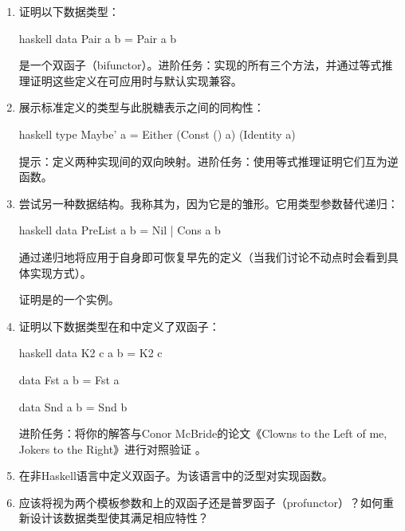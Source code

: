 \begin{enumerate}
  \tightlist
  \item
        证明以下数据类型：

        \begin{snip}{haskell}
data Pair a b = Pair a b
\end{snip}

        是一个双函子（bifunctor）。进阶任务：实现的所有三个方法，并通过等式推理证明这些定义在可应用时与默认实现兼容。
  \item
        展示标准定义的类型与此脱糖表示之间的同构性：

        \begin{snip}{haskell}
type Maybe' a = Either (Const () a) (Identity a)
\end{snip}

        提示：定义两种实现间的双向映射。进阶任务：使用等式推理证明它们互为逆函数。
  \item
        尝试另一种数据结构。我称其为，因为它是的雏形。它用类型参数替代递归：

        \begin{snip}{haskell}
data PreList a b = Nil | Cons a b
\end{snip}

        通过递归地将应用于自身即可恢复早先的定义（当我们讨论不动点时会看到具体实现方式）。

        证明是的一个实例。
  \item
        证明以下数据类型在和中定义了双函子：

        \begin{snip}{haskell}
data K2 c a b = K2 c

data Fst a b = Fst a

data Snd a b = Snd b
\end{snip}

        进阶任务：将你的解答与Conor McBride的论文《Clowns to the Left of me, Jokers to the Right》进行对照验证 。
  \item
        在非Haskell语言中定义双函子。为该语言中的泛型对实现函数。
  \item
        应该将视为两个模板参数和上的双函子还是普罗函子（profunctor）？如何重新设计该数据类型使其满足相应特性？
\end{enumerate}
